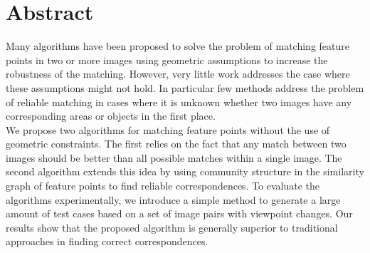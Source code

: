 

\cleardoublepage
\chapter*{Abstract}
Many algorithms have been proposed to solve the problem of matching 
feature points in two or more images using geometric assumptions to 
increase the robustness of the matching. However, very little work 
addresses the case where these assumptions might not hold. In particular 
few methods address the problem of reliable matching in cases where it 
is unknown whether two images have any corresponding areas or objects in 
the first place.  \\

We propose two algorithms for matching feature points without the use of 
geometric constraints. The first relies on the fact that any match 
between two images should be better than all possible matches within a 
single image. The second algorithm extends this idea by using community 
structure in the similarity graph of feature points to find reliable 
correspondences. To evaluate the algorithms experimentally, we introduce 
a simple method to generate a large amount of test cases based on a set 
of image pairs with viewpoint changes. Our results show that the 
proposed algorithm is generally superior to traditional approaches in 
finding correct correspondences.
